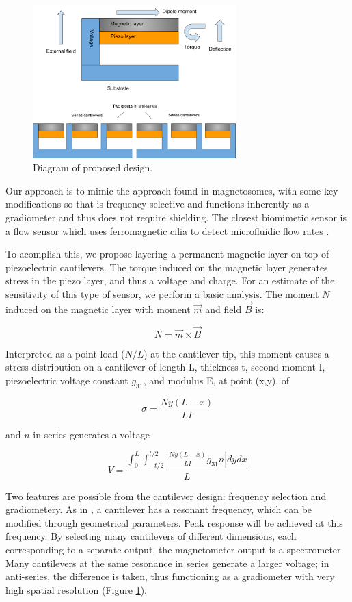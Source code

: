\begin{figure}
\centering
\includegraphics[width=0.7\textwidth]{biomag}
\caption{Diagram of proposed design.}
\label{fig:diagram}
\end{figure}

Our approach is to mimic the approach found in magnetosomes, with some key modifications so that is frequency-selective and functions inherently as a gradiometer and thus does not require shielding. The closest biomimetic sensor is a flow sensor which uses ferromagnetic cilia to detect microfluidic flow rates \cite{alfadhel2014magnetic}.

To acomplish this, we propose layering a permanent magnetic layer on top of piezoelectric cantilevers. The torque induced on the magnetic layer generates stress in the piezo layer, and thus a voltage and charge. For an estimate of the sensitivity of this type of sensor, we perform a basic analysis. The moment $N$ induced on the magnetic layer with moment $\vec{m}$ and field $\vec{B}$ is:

$$  N=\vec{m} \times \vec{B} $$

Interpreted as a point load ($N/L$) at the cantilever tip, this moment causes a stress distribution on a cantilever of length L, thickness t, second moment I, piezoelectric voltage constant $g_{31}$, and modulus E, at point (x,y), of

$$ \sigma=\frac{Ny(L-x)}{LI} $$

and $n$ in series generates a voltage

$$ V=\frac{\int_0^L\int_{-t/2}^{t/2}\left|\frac{Ny(L-x)}{LI}g_{31}n\right|dydx}{L} $$

Two features are possible from the cantilever design: frequency selection and gradiometery. As in \cite{shen2008design}, a cantilever has a resonant frequency, which can be modified through geometrical parameters. Peak response will be achieved at this frequency. By selecting many cantilevers of different dimensions, each corresponding to a separate output, the magnetometer output is a spectrometer. Many cantilevers at the same resonance in series generate a larger voltage; in anti-series, the difference is taken, thus functioning as a gradiometer with very high spatial resolution (Figure \ref{fig:diagram}).

